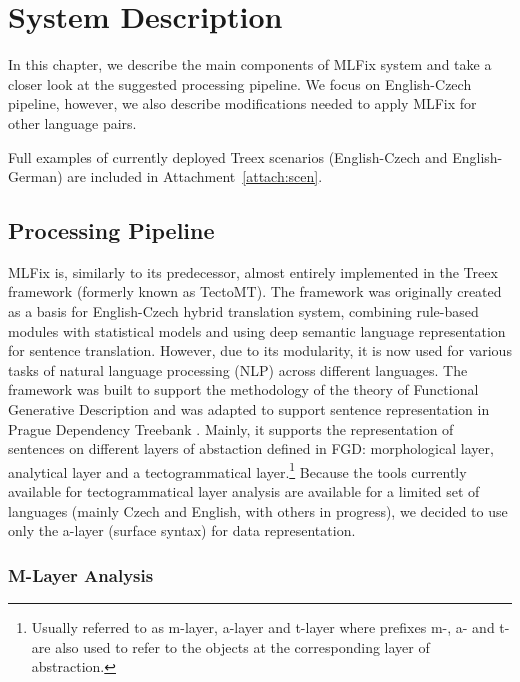\chapter{System Description}
\label{chap:system_descr}

In this chapter, we describe the main components
of MLFix system and take a closer look at the suggested processing pipeline.
We focus on English-Czech pipeline, however, we also describe modifications
needed to apply MLFix for other language pairs.

Full examples of currently deployed Treex scenarios (English-Czech and English-German)
are included in Attachment~\ref{attach:scen}.


\section{Processing Pipeline}

MLFix is, similarly to its predecessor, almost entirely implemented in the
Treex \citep{Popel:2010:TMN:1884371.1884406}
framework (formerly known as TectoMT).
The framework was originally created as a basis for English-Czech hybrid translation system, combining
rule-based modules with statistical models and using deep semantic language representation
for sentence translation. However, due to its modularity, it is
now used for various tasks of natural language processing (NLP) across different
languages. The framework was built to support the methodology of the theory of Functional Generative Description \citep{Sgall1967}
and was adapted to support sentence representation in Prague Dependency Treebank \citep{pdt20:2006}.
Mainly, it supports the representation of sentences on different layers of abstaction defined in FGD: morphological layer,
analytical layer and a tectogrammatical layer.\footnote{Usually referred to as m-layer, a-layer and t-layer where prefixes m-, a- and t- are also used to refer to the objects at the corresponding layer of abstraction.}
Because the tools currently available for tectogrammatical layer analysis are available for
a limited set of languages (mainly Czech and English, with others in progress),
we decided to use only the a-layer (surface syntax) for data representation.

\subsection{M-Layer Analysis}

